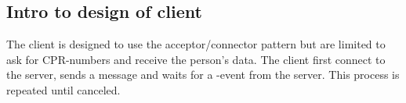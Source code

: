 \documentclass[Main]{subfiles}
\begin{document}
\subsection{Intro to design of client}

The client is designed to use the acceptor/connector pattern but are limited to ask for CPR-numbers and receive the person's data.
The client first connect to the server, sends a message and waits for a -event from the server.
This process is repeated until canceled.
\end{document}
